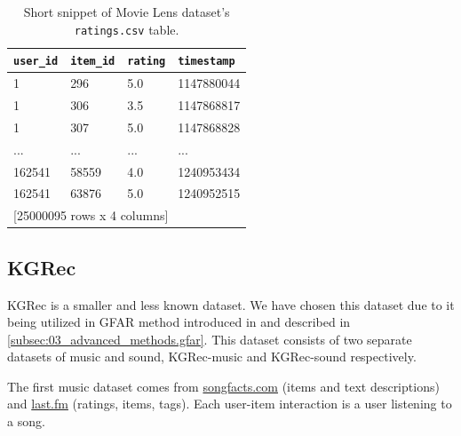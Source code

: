 \begin{table}[!ht]
\centering
\begin{tabular}{ l l l l }

\verb|user_id| & \verb|item_id| & \verb|rating| & \verb|timestamp| \\
    \hline
    1 &      296  &   5.0 & 1147880044 \\
    1 &      306  &   3.5 & 1147868817 \\
    1 &      307  &   5.0 & 1147868828 \\
  ... &      ...  &   ... &        ... \\
162541 &    58559  &   4.0 & 1240953434 \\
162541 &    63876  &   5.0 & 1240952515 \\ [1mm]
\multicolumn{4}{l}{{[25000095 rows x 4 columns]}}
\end{tabular}
\caption{Short snippet of Movie Lens dataset's \texttt{ratings.csv} table.}
\label{table:5.1_ML_ratings}
\end{table}





\subsection{KGRec}
\label{subsec:04_single_user_datasets.kgrec}
KGRec is a smaller and less known dataset. We have chosen this dataset due to it being utilized in GFAR method introduced in \cite{GFAR-kaya2020} and described in \ref{subsec:03_advanced_methods.gfar}. This dataset consists of two separate datasets of music and sound, KGRec-music and KGRec-sound respectively.

The first music dataset comes from \href{https://www.songfacts.com/}{songfacts.com} (items and text descriptions) and \href{https://www.last.fm/}{last.fm} (ratings, items, tags). Each user-item interaction is a user listening to a song.
\newline

